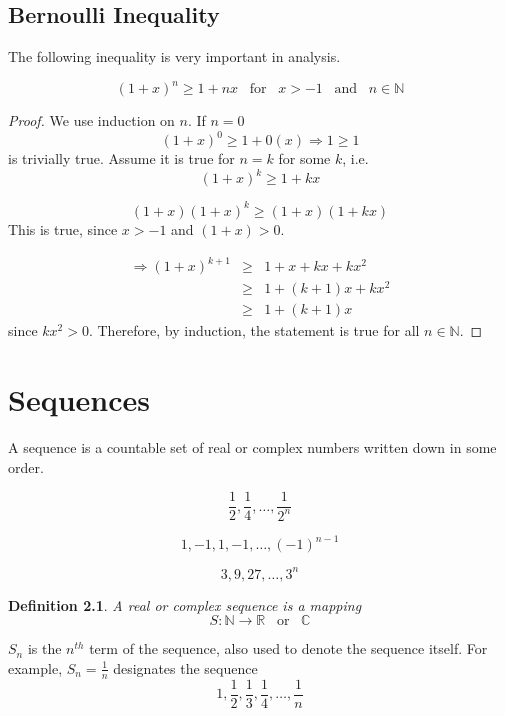 \documentclass[12pt]{scrbook}
\newtheorem*{definition}{Definition}
\begin{document}
\section{Bernoulli Inequality}

The following inequality is very important in analysis.

\[ (1 + x)^n \ge 1 + nx \;\;\; \text{for} \;\;\; x > -1 \;\;\; \text{and} \;\;\; n \in \mathbb{N} \]

\begin{proof}
We use induction on $n$.  If $n = 0$
\[ (1 + x)^0 \ge 1 + 0(x) \Rightarrow 1 \ge 1 \]
is trivially true.  Assume it is true for $n = k$ for some $k$, i.e.
\[ (1 + x)^k \ge 1 + kx \]

\[ (1+x)(1 + x)^k \ge (1+x)(1 + kx) \]
This is true, since $x > -1$ and $(1 + x) > 0$.

\begin{eqnarray*}
\Rightarrow (1+x)^{k+1}  &\ge&  1 + x + kx + kx^2 \\
                                       &\ge& 1 + (k+1)x + kx^2 \\
                                       &\ge& 1 + (k+1)x
\end{eqnarray*}
since $kx^2 > 0$.
Therefore, by induction, the statement is true for all $n \in \mathbb{N}$.

\end{proof}


\chapter{Sequences}

A sequence is a countable set of real or complex numbers written down in some order.

\[ \frac{1}{2}, \frac{1}{4}, \ldots , \frac{1}{2^n}  \]

\[ 1, -1, 1, -1, \ldots , (-1)^{n-1} \]

\[ 3, 9, 27, \ldots , 3^n \]

\begin{definition}
A real or complex sequence is a mapping
\[ S : \mathbb{N} \rightarrow \mathbb{R} \;\;\; \text{or} \;\;\; \mathbb{C} \]
\end{definition}

$S_n$ is the $n^{th}$ term of the sequence, also used to denote the sequence itself. For example, $S_n = \frac{1}{n}$ designates the sequence
\[ 1, \frac{1}{2}, \frac{1}{3},  \frac{1}{4}, \ldots , \frac{1}{n} \]
\end{document}
